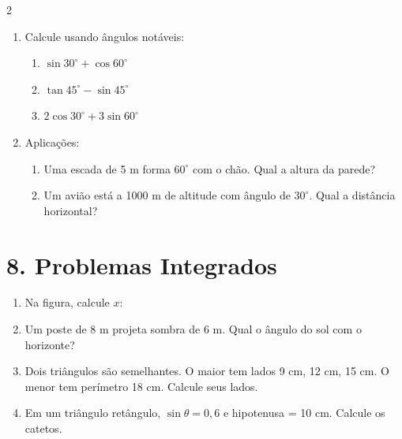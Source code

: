 \documentclass[11pt]{article}
\begin{document}
\begin{multicols}{2}
\begin{enumerate}
    \item Calcule usando ângulos notáveis:
    \begin{enumerate}[label=\alph*)]
        \item $\sin 30^\circ + \cos 60^\circ$
        \item $\tan 45^\circ - \sin 45^\circ$
        \item $2\cos 30^\circ + 3\sin 60^\circ$
    \end{enumerate}
    
    \item Aplicações:
    \begin{enumerate}[label=\alph*)]
        \item Uma escada de 5 m forma $60^\circ$ com o chão. Qual a altura da parede?
        \item Um avião está a 1000 m de altitude com ângulo de $30^\circ$. Qual a distância horizontal?
    \end{enumerate}
\end{enumerate}

\section*{8. Problemas Integrados}

\begin{enumerate}
    \item Na figura, calcule $x$:
    \begin{center}
    \end{center}
    
    \item Um poste de 8 m projeta sombra de 6 m. Qual o ângulo do sol com o horizonte?
    
    \item Dois triângulos são semelhantes. O maior tem lados 9 cm, 12 cm, 15 cm. O menor tem perímetro 18 cm. Calcule seus lados.
    
    \item Em um triângulo retângulo, $\sin\theta = 0,6$ e hipotenusa = 10 cm. Calcule os catetos.
    

\end{enumerate}
\end{multicols}
\end{document}
